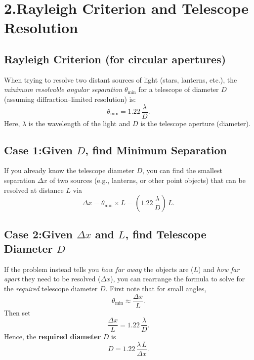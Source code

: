 \documentclass[12pt]{article}
\theoremstyle{definition} %
\theoremstyle{plain} %
\begin{document}
\section*{2.\;Rayleigh Criterion and Telescope Resolution}

\subsection*{Rayleigh Criterion (for circular apertures)}
When trying to resolve two distant sources of light (stars, lanterns, etc.), the 
\emph{minimum resolvable angular separation} $\theta_\mathrm{min}$ for a telescope 
of diameter $D$ (assuming diffraction--limited resolution) is:
\[
  \theta_\mathrm{min} = 1.22\,\frac{\lambda}{D}.
\]
Here, $\lambda$ is the wavelength of the light and $D$ is the telescope aperture (diameter).

\subsection*{Case 1:\;Given $D$, find Minimum Separation}
If you already know the telescope diameter $D$, you can find the smallest separation 
$\Delta x$ of two sources (e.g., lanterns, or other point objects) that can be resolved 
at distance $L$ via
\[
  \Delta x = \theta_\mathrm{min} \times L
           = \left(1.22\,\frac{\lambda}{D}\right)\,L.
\]

\subsection*{Case 2:\;Given $\Delta x$ and $L$, find Telescope Diameter $D$}
If the problem instead tells you \emph{how far away} the objects are ($L$) and 
\emph{how far apart} they need to be resolved ($\Delta x$), you can rearrange the formula 
to solve for the \emph{required} telescope diameter $D$.  First note that for small angles,
\[
  \theta_\mathrm{min} \approx \frac{\Delta x}{L}.
\]
Then set
\[
  \frac{\Delta x}{L} = 1.22\,\frac{\lambda}{D}.
\]
Hence, the \textbf{required diameter} $D$ is
\[
  \boxed{
    D = 1.22\,\frac{\lambda\,L}{\Delta x}.
  }
\]
\end{document}
